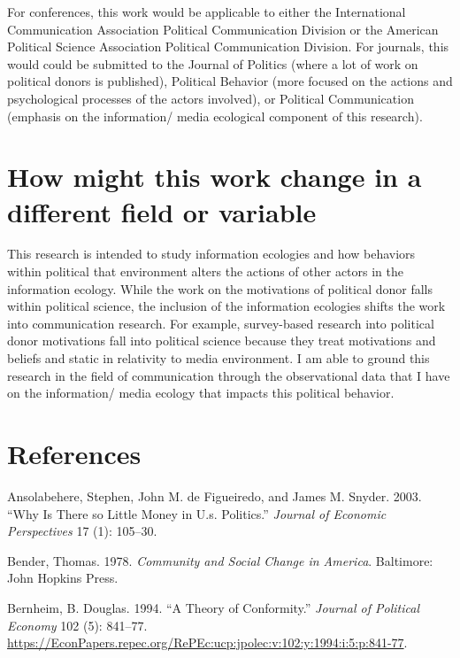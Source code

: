 \documentclass[12pt,]{article}
\begin{document}
For conferences, this work would be applicable to either the
International Communication Association Political Communication Division
or the American Political Science Association Political Communication
Division. For journals, this would could be submitted to the Journal of
Politics (where a lot of work on political donors is published),
Political Behavior (more focused on the actions and psychological
processes of the actors involved), or Political Communication (emphasis
on the information/ media ecological component of this research).

\hypertarget{how-might-this-work-change-in-a-different-field-or-variable}{%
\section{How might this work change in a different field or
variable}\label{how-might-this-work-change-in-a-different-field-or-variable}}

This research is intended to study information ecologies and how
behaviors within political that environment alters the actions of other
actors in the information ecology. While the work on the motivations of
political donor falls within political science, the inclusion of the
information ecologies shifts the work into communication research. For
example, survey-based research into political donor motivations fall
into political science because they treat motivations and beliefs and
static in relativity to media environment. I am able to ground this
research in the field of communication through the observational data
that I have on the information/ media ecology that impacts this
political behavior.

\hypertarget{references}{%
\section*{References}\label{references}}

\hypertarget{refs}{}
\leavevmode\hypertarget{ref-ansolabehere2003}{}%
Ansolabehere, Stephen, John M. de Figueiredo, and James M. Snyder. 2003.
``Why Is There so Little Money in U.s. Politics.'' \emph{Journal of
Economic Perspectives} 17 (1): 105--30.

\leavevmode\hypertarget{ref-bender1978}{}%
Bender, Thomas. 1978. \emph{Community and Social Change in America}.
Baltimore: John Hopkins Press.

\leavevmode\hypertarget{ref-bernheim1994}{}%
Bernheim, B. Douglas. 1994. ``A Theory of Conformity.'' \emph{Journal of
Political Economy} 102 (5): 841--77.
\url{https://EconPapers.repec.org/RePEc:ucp:jpolec:v:102:y:1994:i:5:p:841-77}.
\end{document}
